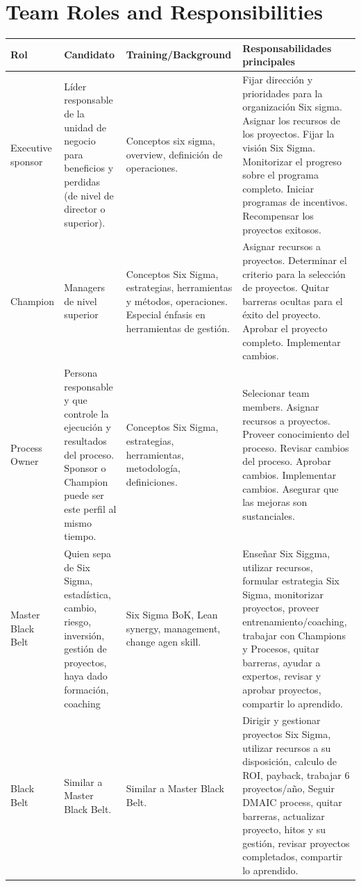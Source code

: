 \documentclass[oneside]{book}
\begin{document}
\section{Team Roles and Responsibilities}

\begin{tabular}{p{1.5cm}|p{3cm}|p{4cm}|p{7cm}}
	\hline Rol & Candidato & Training/Background & Responsabilidades principales \\ 
	\hline Executive sponsor & Líder responsable de la unidad de negocio para beneficios y perdidas (de nivel de director o superior). & Conceptos six sigma, overview, definición de operaciones. & Fijar dirección y prioridades para la organización Six sigma. Asignar los recursos de los proyectos. Fijar la visión Six Sigma. Monitorizar el progreso sobre el programa completo. Iniciar programas de incentivos. Recompensar los proyectos exitosos.  \\ 
	\hline Champion & Managers de nivel superior & Conceptos Six Sigma, estrategias, herramientas y métodos, operaciones. Especial énfasis en herramientas de gestión. & Asignar recursos a proyectos. Determinar el criterio para la selección de proyectos. Quitar barreras ocultas para el éxito del proyecto. Aprobar el proyecto completo. Implementar cambios. \\ 
	\hline Process Owner & Persona responsable y que controle la ejecución y resultados del proceso. Sponsor o Champion puede ser este perfil al mismo tiempo. & Conceptos Six Sigma, estrategias, herramientas, metodología, definiciones. & Selecionar team members. Asignar recursos a proyectos. Proveer conocimiento del proceso. Revisar cambios del proceso. Aprobar cambios. Implementar cambios. Asegurar que las mejoras son sustanciales. \\ 
	\hline Master Black Belt & Quien sepa de Six Sigma, estadística, cambio, riesgo, inversión, gestión de proyectos, haya dado formación, coaching & Six Sigma BoK, Lean synergy, management, change agen skill. & Enseñar Six Siggma, utilizar recursos, formular estrategia Six Sigma, monitorizar proyectos, proveer entrenamiento/coaching, trabajar con Champions y Procesos, quitar barreras, ayudar a expertos, revisar y aprobar proyectos, compartir lo aprendido. \\
	\hline Black Belt & Similar a Master Black Belt. & Similar a Master Black Belt. & Dirigir y gestionar proyectos Six Sigma, utilizar recursos a su disposición, calculo de ROI, payback, trabajar 6 proyectos/año, Seguir DMAIC process, quitar barreras, actualizar proyecto, hitos y su gestión, revisar proyectos completados, compartir lo aprendido.\\

\end{tabular}
\end{document}
